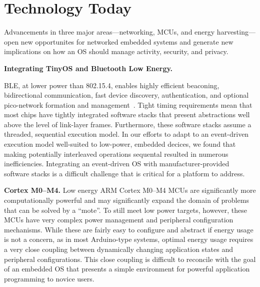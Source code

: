 \section{Technology Today}
Advancements in three major areas---networking, MCUs, and energy
harvesting---open new opportunites for networked embedded systems and generate
new implications on how an OS should manage activity, security, and privacy.


\smallskip\noindent
\textbf{Integrating TinyOS and Bluetooth Low Energy.}

BLE, at lower power than 802.15.4, enables highly efficient beaconing,
bidirectional communication, fast device discovery, authentication, and
optional pico-network formation and management~\cite{ble-overview}.
%
Tight timing requirements mean that most chips have tightly
integrated software stacks that present abstractions well above 
the level of link-layer frames. Furthermore, these software stacks
assume a threaded, sequential execution model. In our efforts to
adapt to an event-driven execution model well-suited to low-power,
embedded decices, we found that making potentially interleaved operations
sequental resulted in numerous inefficiencies. Integrating an
event-driven OS
with manufacturer-provided software stacks is a difficult challenge that
is critical for a platform to address.


\smallskip\noindent
\textbf{Cortex M0--M4.}
Low energy ARM Cortex M0--M4 MCUs are significantly more computationally
powerful and may significantly expand the domain of problems that can be
solved by a ``mote''.
%
To still meet low power targets, however, these MCUs have very complex power
management and peripheral configuration mechanisms. While these are fairly
easy to configure and abstract if energy usage is not a concern, as in most
Arduino-type systems, optimal energy usage requires a very close coupling
between dynamically changing application states and peripheral configurations.
This close coupling is difficult to reconcile with the goal of an embedded
OS that presents a simple environment for powerful application programming to
novice users.

